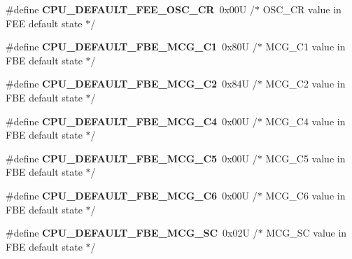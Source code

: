 \begin{DoxyCompactItemize}
\item 
\#define {\bfseries C\+P\+U\+\_\+\+D\+E\+F\+A\+U\+L\+T\+\_\+\+F\+E\+E\+\_\+\+O\+S\+C\+\_\+\+CR}~0x00\+U     /$\ast$ O\+S\+C\+\_\+\+C\+R value in F\+E\+E default state $\ast$/\hypertarget{group___c_p_u___config__module_ga5bcde41682d94cba022b1375e8f92df8}{}\label{group___c_p_u___config__module_ga5bcde41682d94cba022b1375e8f92df8}

\item 
\#define {\bfseries C\+P\+U\+\_\+\+D\+E\+F\+A\+U\+L\+T\+\_\+\+F\+B\+E\+\_\+\+M\+C\+G\+\_\+\+C1}~0x80\+U     /$\ast$ M\+C\+G\+\_\+\+C1 value in F\+B\+E default state $\ast$/\hypertarget{group___c_p_u___config__module_ga03d7d75cdb865db60bd3b03d97d7044a}{}\label{group___c_p_u___config__module_ga03d7d75cdb865db60bd3b03d97d7044a}

\item 
\#define {\bfseries C\+P\+U\+\_\+\+D\+E\+F\+A\+U\+L\+T\+\_\+\+F\+B\+E\+\_\+\+M\+C\+G\+\_\+\+C2}~0x84\+U     /$\ast$ M\+C\+G\+\_\+\+C2 value in F\+B\+E default state $\ast$/\hypertarget{group___c_p_u___config__module_gab624039d938416d30e20662c658229a2}{}\label{group___c_p_u___config__module_gab624039d938416d30e20662c658229a2}

\item 
\#define {\bfseries C\+P\+U\+\_\+\+D\+E\+F\+A\+U\+L\+T\+\_\+\+F\+B\+E\+\_\+\+M\+C\+G\+\_\+\+C4}~0x00\+U     /$\ast$ M\+C\+G\+\_\+\+C4 value in F\+B\+E default state $\ast$/\hypertarget{group___c_p_u___config__module_ga35333d147eda6ec032584193cc4a3d7a}{}\label{group___c_p_u___config__module_ga35333d147eda6ec032584193cc4a3d7a}

\item 
\#define {\bfseries C\+P\+U\+\_\+\+D\+E\+F\+A\+U\+L\+T\+\_\+\+F\+B\+E\+\_\+\+M\+C\+G\+\_\+\+C5}~0x00\+U     /$\ast$ M\+C\+G\+\_\+\+C5 value in F\+B\+E default state $\ast$/\hypertarget{group___c_p_u___config__module_gaf7287b4a771483798065109b9a33e0db}{}\label{group___c_p_u___config__module_gaf7287b4a771483798065109b9a33e0db}

\item 
\#define {\bfseries C\+P\+U\+\_\+\+D\+E\+F\+A\+U\+L\+T\+\_\+\+F\+B\+E\+\_\+\+M\+C\+G\+\_\+\+C6}~0x00\+U     /$\ast$ M\+C\+G\+\_\+\+C6 value in F\+B\+E default state $\ast$/\hypertarget{group___c_p_u___config__module_gab392e6abd7fae6ebb9893785db27f8a0}{}\label{group___c_p_u___config__module_gab392e6abd7fae6ebb9893785db27f8a0}

\item 
\#define {\bfseries C\+P\+U\+\_\+\+D\+E\+F\+A\+U\+L\+T\+\_\+\+F\+B\+E\+\_\+\+M\+C\+G\+\_\+\+SC}~0x02\+U     /$\ast$ M\+C\+G\+\_\+\+S\+C value in F\+B\+E default state $\ast$/\hypertarget{group___c_p_u___config__module_gaa444f6e47a332995d64c97188e52b07b}{}\label{group___c_p_u___config__module_gaa444f6e47a332995d64c97188e52b07b}


\end{DoxyCompactItemize}
